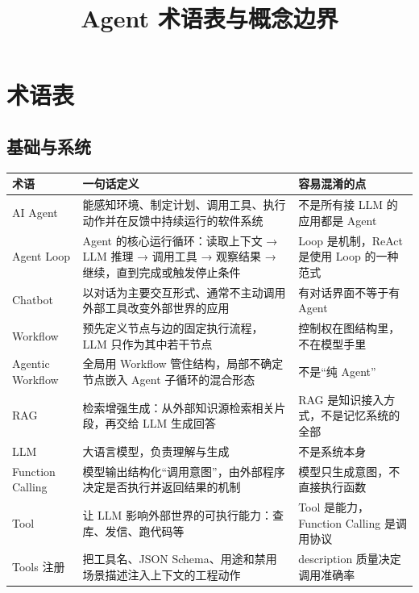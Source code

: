 \documentclass[9pt,a4paper,twocolumn]{ctexart}
\begin{document}
\title{Agent 术语表与概念边界}
\date{}
\maketitle
{}

\section*{术语表}


\subsection*{基础与系统}

{\footnotesize
\begin{tabular}{|p{}|p{}|p{}|}
\hline
\textbf{术语} & \textbf{一句话定义} & \textbf{容易混淆的点} \\
\hline
AI Agent & 能感知环境、制定计划、调用工具、执行动作并在反馈中持续运行的软件系统 & 不是所有接 LLM 的应用都是 Agent \\
\hline
Agent Loop & Agent 的核心运行循环：读取上下文 → LLM 推理 → 调用工具 → 观察结果 → 继续，直到完成或触发停止条件 & Loop 是机制，ReAct 是使用 Loop 的一种范式 \\
\hline
Chatbot & 以对话为主要交互形式、通常不主动调用外部工具改变外部世界的应用 & 有对话界面不等于有 Agent \\
\hline
Workflow & 预先定义节点与边的固定执行流程，LLM 只作为其中若干节点 & 控制权在图结构里，不在模型手里 \\
\hline
Agentic Workflow & 全局用 Workflow 管住结构，局部不确定节点嵌入 Agent 子循环的混合形态 & 不是“纯 Agent” \\
\hline
RAG & 检索增强生成：从外部知识源检索相关片段，再交给 LLM 生成回答 & RAG 是知识接入方式，不是记忆系统的全部 \\
\hline
LLM & 大语言模型，负责理解与生成 & 不是系统本身 \\
\hline
Function Calling & 模型输出结构化“调用意图”，由外部程序决定是否执行并返回结果的机制 & 模型只生成意图，不直接执行函数 \\
\hline
Tool & 让 LLM 影响外部世界的可执行能力：查库、发信、跑代码等 & Tool 是能力，Function Calling 是调用协议 \\
\hline
Tools 注册 & 把工具名、JSON Schema、用途和禁用场景描述注入上下文的工程动作 & description 质量决定调用准确率 \\

\end{tabular}}
\end{document}
